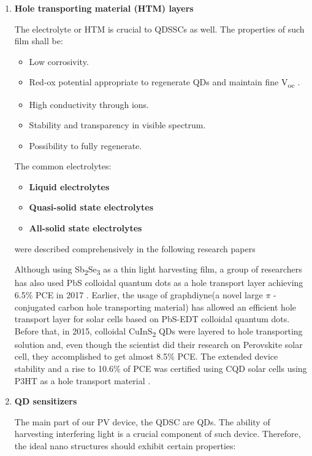 \begin{enumerate}
\item \textbf{Hole transporting material (HTM) layers}

The electrolyte or HTM is crucial to QDSSCs as well. The properties of
such film shall be:

\begin{itemize}
\item
  Low corrosivity.
\item
  Red-ox potential appropriate to regenerate QDs and maintain fine
  V\textsubscript{oc} .
\item
  High conductivity through ions.
\item
  Stability and transparency in visible spectrum.
\item
  Possibility to fully regenerate. \cite{HuashangRao2018}
\end{itemize}

The common electrolytes:

\begin{itemize}
\item
  \textbf{Liquid electrolytes}
\item
  \textbf{Quasi-solid state electrolytes}
\item
  \textbf{All-solid state electrolytes}
\end{itemize}

were described comprehensively in the following research papers \cite{HuashangRao2018} \cite{Zhang2015} \cite{Song2017}

Although using Sb\textsubscript{2}Se\textsubscript{3} as a thin light
harvesting film, a group of researchers has also used PbS colloidal
quantum dots as a hole transport layer achieving 6.5\% PCE in 2017 \cite{Wang2017}. Earlier, the usage of graphdiyne(a novel large $\pi$ -conjugated carbon hole transporting material) has allowed an efficient hole transport layer for solar cells based on PbS-EDT colloidal quantum dots\cite{MingjianYuan2016}. Before that, in 2015, colloidal CuInS\textsubscript{2} QDs were layered to hole transporting solution and, even though the scientist did their research on Perovskite solar cell, they accomplished to get almost 8.5\% PCE\cite{JunZhu2015}. The extended device stability and a rise to 10.6\% of PCE was certified using CQD solar cells using P3HT as a hole transport material \cite{Zhang2016}.


\item \textbf{QD sensitizers }

The main part of our PV device, the QDSC are QDs. The ability of harvesting interfering light is a crucial component of such device. \cite{Ikeda2014} Therefore, the ideal nano structures should exhibit certain properties:


\end{enumerate}
